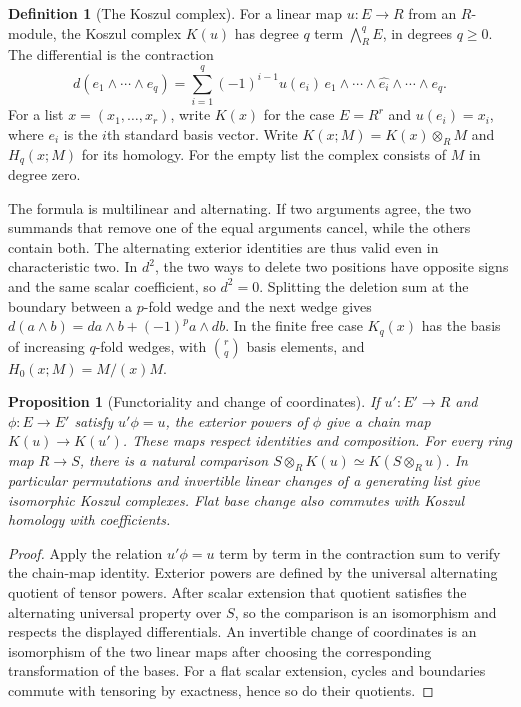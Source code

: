 \documentclass[11pt,oneside,openany]{book}
\newtheorem{proposition}[theorem]{Proposition}
\theoremstyle{definition}
\newtheorem{definition}[theorem]{Definition}
\theoremstyle{remark}
\begin{document}
\begin{definition}[The Koszul complex]\label{res:RK-03}
For a linear map $u:E\to R$ from an $R$-module, the Koszul complex
$K(u)$ has degree $q$ term $\bigwedge^q_R E$, in degrees $q\ge0$.
The differential is the contraction
\[
 d(e_1\wedge\cdots\wedge e_q)
 =\sum_{i=1}^q(-1)^{i-1}u(e_i)\,
     e_1\wedge\cdots\wedge\widehat{e_i}\wedge\cdots\wedge e_q.
\]
For a list $x=(x_1,\ldots,x_r)$, write $K(x)$ for the case
$E=R^r$ and $u(e_i)=x_i$, where $e_i$ is the $i$th standard basis
vector. Write $K(x;M)=K(x)\otimes_R M$ and $H_q(x;M)$ for its
homology. For the empty list the complex consists of $M$ in degree zero.
\end{definition}

The formula is multilinear and alternating. If two arguments agree,
the two summands that remove one of the equal arguments cancel, while
the others contain both. The alternating exterior identities are thus
valid even in characteristic two. In $d^2$, the two ways to delete
two positions have opposite signs and the same scalar coefficient,
so $d^2=0$. Splitting the deletion sum at the boundary between a
$p$-fold wedge and the next wedge gives
$d(a\wedge b)=da\wedge b+(-1)^p a\wedge db$. In the finite free case
$K_q(x)$ has the basis of increasing $q$-fold wedges, with
$\binom rq$ basis elements, and $H_0(x;M)=M/(x)M$.

\begin{proposition}[Functoriality and change of coordinates]
\label{res:RK-04}
If $u'\colon E'\to R$ and $\phi\colon E\to E'$ satisfy $u'\phi=u$,
the exterior powers of $\phi$ give a chain map $K(u)\to K(u')$.
These maps respect identities and composition. For every ring map $R\to S$,
there is a natural comparison $S\otimes_R K(u)\simeq K(S\otimes_R u)$.
In particular permutations and invertible linear changes of a
generating list give isomorphic Koszul complexes. Flat base change
also commutes with Koszul homology with coefficients.
\end{proposition}
\begin{proof}
Apply the relation $u'\phi=u$ term by term in the contraction sum to
verify the chain-map identity. Exterior powers are defined by the
universal alternating quotient of tensor powers. After scalar extension
that quotient satisfies the alternating universal property over $S$,
so the comparison is an isomorphism and respects the displayed
differentials. An invertible change of coordinates is an isomorphism
of the two linear maps after choosing the corresponding transformation
of the bases. For a flat scalar extension, cycles and boundaries
commute with tensoring by exactness, hence so do their quotients.
\end{proof}
\end{document}
